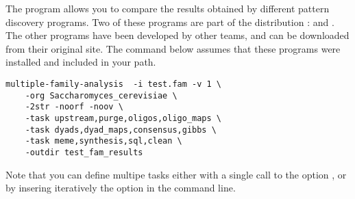 The program  allows you to compare
the results obtained by different pattern discovery programs. Two of
these programs are part of the \RSAT distribution :
 and . The other
programs have been developed by other teams, and can be downloaded
from their original site. The command below assumes that these
programs were installed and included in your path.

\begin{verbatim}
multiple-family-analysis  -i test.fam -v 1 \
    -org Saccharomyces_cerevisiae \
    -2str -noorf -noov \
    -task upstream,purge,oligos,oligo_maps \
    -task dyads,dyad_maps,consensus,gibbs \
    -task meme,synthesis,sql,clean \
    -outdir test_fam_results
\end{verbatim}

Note that you can define multipe tasks either with a single call to
the option \option{-task}, or by insering iteratively the option in
the command line.


